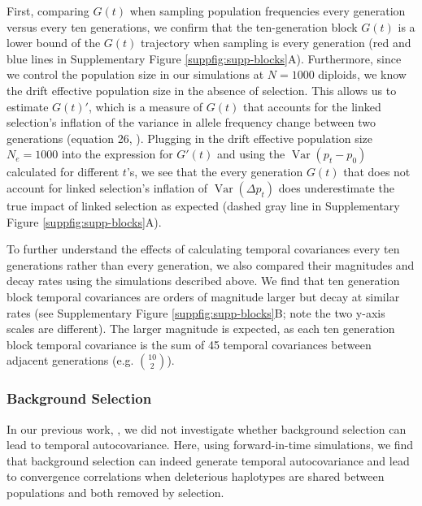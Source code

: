 \documentclass[11pt]{article}
\DeclareMathOperator{\var}{Var}
\begin{document}
First, comparing $G(t)$ when sampling population frequencies every generation
versus every ten generations, we confirm that the ten-generation block $G(t)$
is a lower bound of the $G(t)$ trajectory when sampling is every generation
(red and blue lines in Supplementary Figure \ref{suppfig:supp-blocks}A).
Furthermore, since we control the population size in our simulations at $N =
1000$ diploids, we know the drift effective population size in the absence of
selection. This allows us to estimate $G(t)'$, which is a measure of $G(t)$
that accounts for the linked selection's inflation of the variance in allele
frequency change between two generations (equation 26, \cite{Buffalo2019-io}).
Plugging in the drift effective population size $N_e = 1000$ into the
expression for $G'(t)$ and using the $\var(p_t - p_0)$ calculated for different
$t$'s, we see that the every generation $G(t)$ that does not account for linked
selection's inflation of $\var(\Delta p_t)$ does underestimate the true impact
of linked selection as expected (dashed gray line in Supplementary Figure
\ref{suppfig:supp-blocks}A).

To further understand the effects of calculating temporal covariances every ten
generations rather than every generation, we also compared their magnitudes and
decay rates using the simulations described above. We find that ten generation
block temporal covariances are orders of magnitude larger but decay at similar
rates (see Supplementary Figure \ref{suppfig:supp-blocks}B; note the two y-axis
scales are different). The larger magnitude is expected, as each ten generation
block temporal covariance is the sum of 45 temporal covariances between
adjacent generations (e.g. $10 \choose 2$).

\subsubsection{Background Selection}

In our previous work, \textcite{Buffalo2019-io}, we did not investigate whether
background selection can lead to temporal autocovariance. Here, using
forward-in-time simulations, we find that background selection can indeed
generate temporal autocovariance and lead to convergence correlations when
deleterious haplotypes are shared between populations and both removed by
selection. 
\end{document}
